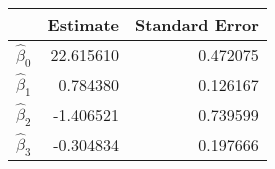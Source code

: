 \begin{tabular}{lrr}
\toprule
{} &   Estimate &  Standard Error \\
\midrule
$\hat\beta_0$ &  22.615610 &        0.472075 \\
$\hat\beta_1$ &   0.784380 &        0.126167 \\
$\hat\beta_2$ &  -1.406521 &        0.739599 \\
$\hat\beta_3$ &  -0.304834 &        0.197666 \\
\bottomrule
\end{tabular}
